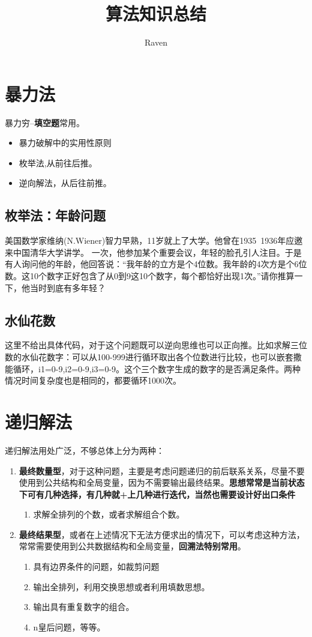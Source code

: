 \documentclass[a4paper]{article}
\title{算法知识总结}
\author{Raven}
\begin{document}
	\maketitle
	\tableofcontents
	
	\section{暴力法}
	暴力穷--\textbf{填空题}常用。
	\begin{itemize}
		\item 暴力破解中的实用性原则
		\item 枚举法,从前往后推。
		\item 逆向解法，从后往前推。
	\end{itemize}
	\subsection{枚举法：年龄问题}
	美国数学家维纳(N.Wiener)智力早熟，11岁就上了大学。他曾在1935~1936年应邀来中国清华大学讲学。
	一次，他参加某个重要会议，年轻的脸孔引人注目。于是有人询问他的年龄，他回答说：“我年龄的立方是个4位数。我年龄的4次方是个6位数。这10个数字正好包含了从0到9这10个数字，每个都恰好出现1次。”请你推算一下，他当时到底有多年轻？
	
	\subsection{水仙花数}
	这里不给出具体代码，对于这个问题既可以逆向思维也可以正向推。比如求解三位数的水仙花数字：可以从100-999进行循环取出各个位数进行比较，也可以嵌套撒能循环，i1=0-9,i2=0-9,i3=0-9。这个三个数字生成的数字的是否满足条件。两种情况时间复杂度也是相同的，都要循环1000次。
	\section{递归解法}
	递归解法用处广泛，不够总体上分为两种：
	\begin{enumerate}
		\item \textbf{最终数量型}，对于这种问题，主要是考虑问题递归的前后联系关系，尽量不要使用到公共结构和全局变量，因为不需要输出最终结果。\textbf{思想常常是当前状态下可有几种选择，有几种就+上几种进行迭代，当然也需要设计好出口条件}
		\begin{enumerate}
			\item 求解全排列的个数，或者求解组合个数。
		\end{enumerate}
		\item \textbf{最终结果型}，或者在上述情况下无法方便求出的情况下，可以考虑这种方法，常常需要使用到公共数据结构和全局变量，\textbf{回溯法特别常用}。
		\begin{enumerate}
			\item 具有边界条件的问题，如裁剪问题
			\item 输出全排列，利用交换思想或者利用填数思想。
			\item 输出具有重复数字的组合。
			\item n皇后问题，等等。
		\end{enumerate}
	\end{enumerate}
\end{document}
